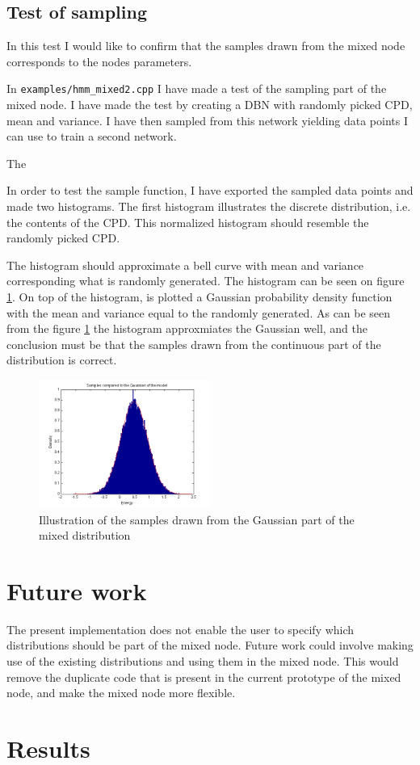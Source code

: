 \documentclass[10pt, conference, compsocconf,a4paper]{IEEEtran}
\begin{document}
\subsection{Test of sampling} %
\label{sub:test_of_sampling}
In this test I would like to confirm that the samples drawn from the mixed node corresponds to the nodes parameters.

In \texttt{examples/hmm\_mixed2.cpp} I have made a test of the sampling part of the mixed node. I have made the test by creating a DBN with randomly picked CPD, mean and variance. I have then sampled from this network yielding data points I can use to train a second network.

The 

In order to test the sample function, I have exported the sampled data points and made two histograms. The first histogram illustrates the discrete distribution, i.e. the contents of the CPD. This normalized histogram should resemble the randomly picked CPD.

The histogram should approximate a bell curve with mean and variance corresponding what is randomly generated. The histogram can be seen on figure \ref{fig1}. On top of the histogram, is plotted a Gaussian probability density function with the mean and variance equal to the randomly generated. As can be seen from the figure \ref{fig1} the histogram approxmiates the Gaussian well, and the conclusion must be that the samples drawn from the continuous part of the distribution is correct.

\begin{figure}
\centering
\includegraphics[width=0.5\textwidth]{figures/fig1.png}
\caption{Illustration of the samples drawn from the Gaussian part of the mixed distribution}
\label{fig1}
\end{figure}



\section{Future work} %
\label{sec:future_work}
The present implementation does not enable the user to specify which distributions should be part of the mixed node. Future work could involve making use of the existing distributions and using them in the mixed node. This would remove the duplicate code that is present in the current prototype of the mixed node, and make the mixed node more flexible.


\section{Results} %
\label{sec:results}






\end{document}
